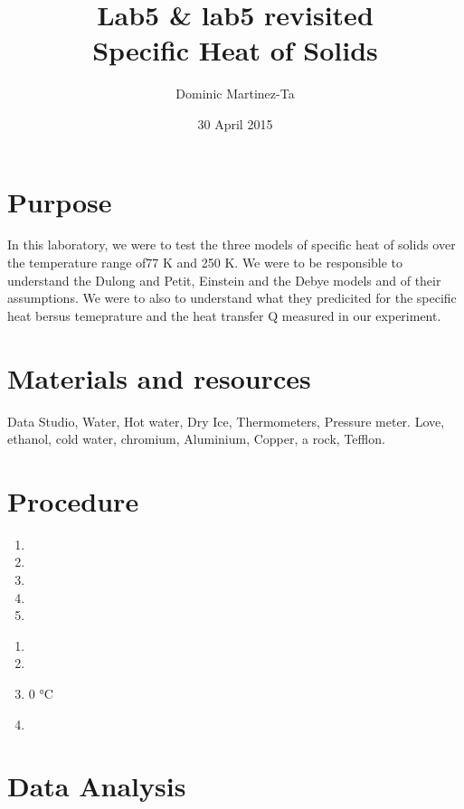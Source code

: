 \documentclass[12pt]{report}
\begin{document}
\title{Lab5 \& lab5 revisited \\ Specific Heat of Solids }
\author{Dominic Martinez-Ta}
\date{30 April 2015}
\maketitle


\section{Purpose}
	
	In this laboratory, we were to test the three models of specific heat of solids over the temperature range of77 K and 250 K. We were to be responsible to understand the Dulong and Petit, Einstein and the Debye models and of their assumptions. We were to also to understand what they predicited for the specific heat bersus temeprature and the heat transfer Q measured in our experiment.
\section {Materials and resources}

	Data Studio, Water, Hot water, Dry Ice, Thermometers, Pressure meter. Love, ethanol, cold water, chromium, Aluminium, Copper, a rock, Tefflon.

\section{Procedure}
	\begin{enumerate}
		\item  
		\item 
		\item
		\item
		\item  
	\end{enumerate}

	\begin{enumerate}
		\item 
		\item 
		\item 0 °C
		\item 
	\end{enumerate}
\section{Data Analysis}
	
\end{document}
